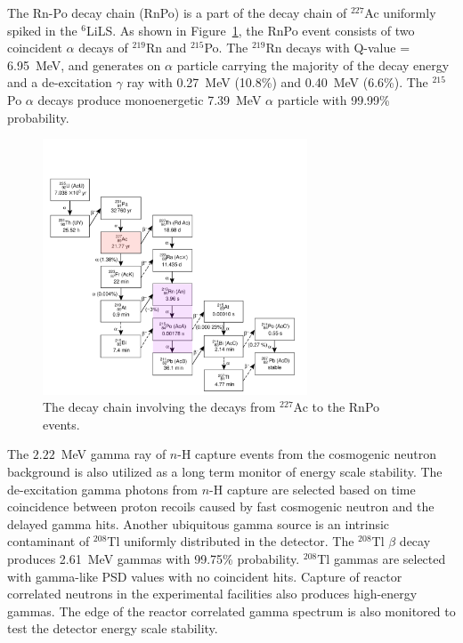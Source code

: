 The Rn-Po decay chain (RnPo) is a part of the decay chain of $^{227}$Ac uniformly spiked in the $^6$LiLS.
As shown in Figure~\ref{fig:RnPoChain}, the RnPo event consists of two coincident $\alpha$ decays of $^{219}$Rn and $^{215}$Po.
The $^{219}$Rn decays with Q-value = 6.95~MeV, and generates on $\alpha$ particle carrying the majority of the decay energy and a de-excitation $\gamma$ ray with 0.27~MeV (10.8\%) and 0.40~MeV (6.6\%).
The $^{215}$Po $\alpha$ decays produce monoenergetic 7.39~MeV $\alpha$ particle with 99.99\% probability.
\begin{figure}[h!]
\centering
\includegraphics[width=0.7\textwidth]{Figures/Ac227Chain.png}
\caption[The decay chain involving the decays from $^{227}$Ac to the RnPo events]{The decay chain involving the decays from $^{227}$Ac to the  RnPo events. }
\label{fig:RnPoChain}
\end{figure}

The $2.22$~MeV gamma ray of $n$-H capture events from the cosmogenic neutron background is also utilized as a long term monitor of energy scale stability.
The de-excitation gamma photons from $n$-H capture are selected based on time coincidence between proton recoils caused by fast cosmogenic neutron and the delayed gamma hits.
Another ubiquitous gamma source is an intrinsic contaminant of $^{208}$Tl uniformly distributed in the detector.
The $^{208}$Tl $\beta$ decay produces 2.61~MeV gammas with 99.75\% probability.
$^{208}$Tl gammas are selected with gamma-like PSD values with no coincident hits. 
Capture of reactor correlated neutrons in the experimental facilities also produces high-energy gammas.
The edge of the reactor correlated gamma spectrum is also monitored to test the detector energy scale stability.

